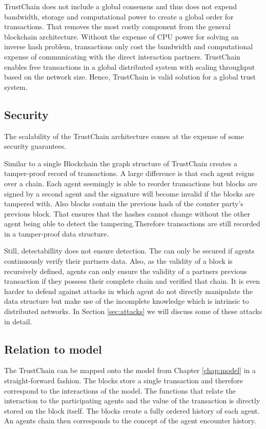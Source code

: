 TrustChain does not include a global consensus and thus does not expend bandwidth, storage and 
computational power to create a global order for transactions. That removes the most costly component
from the general blockchain architecture. Without the expense of CPU power for solving an inverse 
hash problem, transactions only cost the bandwidth and computational expense of communicating with 
the direct interaction partners. TrustChain enables free transactions in a global distributed 
system with scaling throughput based on the network size. Hence, TrustChain is valid solution for a
global trust system.

\subsection{Security}
The scalability of the TrustChain architecture comes at the expense of some security guarantees.

Similar to a single Blockchain the graph structure of TrustChain creates a tamper-proof record of
transactions. A large difference is that each agent reigns over a chain. Each agent seemingly is 
able to reorder transactions but blocks are signed by a second agent and the signature will become
invalid if the blocks are tampered with. Also blocks contain the previous hash of the counter party's
previous block. That ensures that the hashes cannot change without the other agent being able to 
detect the tampering.Therefore transactions are still recorded in a tamper-proof data structure.

Still, detectabillity does not ensure detection. The can only be secured if agents
continuously verify their partners data. Also, as the validity of a block is recursively defined, 
agents can only ensure the validity of a partners previous transaction if they possess their complete
chain and verified that chain. It is even harder to defend against attacks in which agent do not 
directly manipulate the data structure but make use of the incomplete knowledge which is intrinsic 
to distributed networks. In Section \ref{sec:attacks} we will discuss some of these attacks in detail.

\subsection{Relation to model}
The TrustChain can be mapped onto the model from Chapter \ref{chap:model} in a straight-forward 
fashion. The blocks store a single transaction and therefore correspond to the interactions of the
model. The functions that relate the interaction to the participating agents and the value of the 
transaction is directly stored on the block itself. The blocks create a fully ordered history of 
each agent. An agents chain then corresponds to the concept of the agent encounter history.

